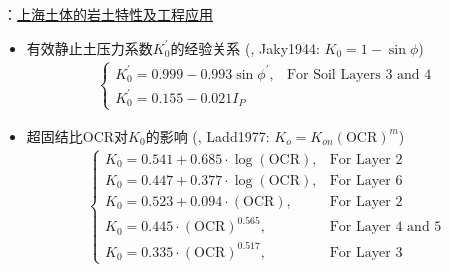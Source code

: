 \begin{frame}{\citet{Gao1986}：\href{run:./papers/Gao1986-Geotechnical properties of Shanghai soils and engineering applications.pdf}{上海土体的岩土特性及工程应用}}
    \begin{itemize}
        \item 有效静止土压力系数$K_0^\prime$的经验关系 (, {Jaky1944}: $K_0=1-\sin\phi$) 
        \begin{align}
            \begin{cases}
                K_0^\prime=0.999-0.993\sin\phi^\prime,& \text{For Soil Layers 3 and 4} \\
                K_0^\prime=0.155-0.021I_P
            \end{cases}
        \end{align}
        \item 超固结比OCR对$K_0$的影响 (, {Ladd1977}: $K_o=K_{on}(\mathrm{OCR})^m$) 
        \begin{align}
            \begin{cases}
                K_0=0.541+0.685\cdot \log(\mathrm{OCR}), &\text{For Layer 2} \\
                K_0=0.447+0.377\cdot \log(\mathrm{OCR}), &\text{For Layer 6} \\
                K_0=0.523+0.094\cdot (\mathrm{OCR}), &\text{For Layer 2} \\
                K_0=0.445\cdot (\mathrm{OCR})^{0.565}, &\text{For Layer 4 and 5} \\
                K_0=0.335\cdot (\mathrm{OCR})^{0.517}, &\text{For Layer 3} 
            \end{cases}
        \end{align}
    \end{itemize}
\end{frame}

